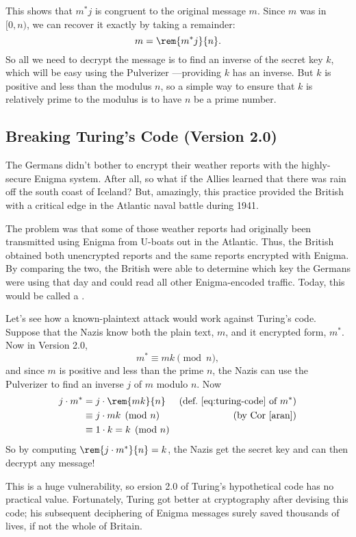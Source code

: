 This shows that $m^* j$ is congruent to the original message $m$.  Since $m$ was in
$[0,n)$, we can recover it exactly by taking a remainder:
\[
m = \rem{m^* j}{n}.
\]
So all we need to decrypt the message is to find an inverse of the
secret key $k$, which will be easy using the Pulverizer ---providing
$k$ has an inverse.  But $k$ is positive and less than the modulus
$n$, so a simple way to ensure that $k$ is relatively prime to the
modulus is to have $n$ be a prime number.

\subsection{Breaking Turing's Code (Version 2.0)}

The Germans didn't bother to encrypt their weather reports with the
highly-secure Enigma system.  After all, so what if the Allies learned
that there was rain off the south coast of Iceland?  But, amazingly,
this practice provided the British with a critical edge in the
Atlantic naval battle during 1941.

The problem was that some of those weather reports had originally been
transmitted using Enigma from U-boats out in the Atlantic.  Thus, the
British obtained both unencrypted reports and the same reports
encrypted with Enigma.  By comparing the two, the British were able to
determine which key the Germans were using that day and could read all
other Enigma-encoded traffic.  Today, this would be called a
.

Let's see how a known-plaintext attack would work against Turing's
code.  Suppose that the Nazis know both the plain text, $m$, and it
encrypted form, $m^*$.  Now in Version 2.0,
\[
m^* \equiv mk \pmod{n},
\]
and since $m$ is positive and less than the prime $n$, the Nazis can use
the Pulverizer to find an inverse $j$ of $m$ modulo $n$.  Now
\begin{align*}
j \cdot m^*
  & = j \cdot \rem{mk}{n}
     & \text{(def.~\eqref{eq:turing-code} of $m^*$)}\\
  & \equiv j \cdot mk \pmod{n}
     & \text{(by Cor~\ref{aran})}\\
  & \equiv 1 \cdot k = k \pmod{n}
\end{align*}
So by computing $\rem{j \cdot m^*}{n} = k$, the Nazis get the secret
key and can then decrypt any message!

This is a huge vulnerability, so ersion 2.0 of Turing's hypothetical
code has no practical value.  Fortunately, Turing got better at
cryptography after devising this code; his subsequent deciphering of
Enigma messages surely saved thousands of lives, if not the whole of
Britain.

